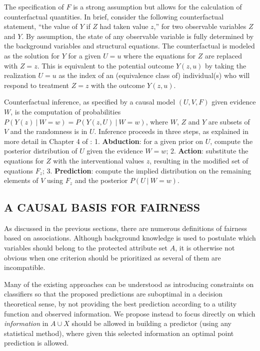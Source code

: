 The specification of $F$ is a strong assumption but allows for the
calculation of counterfactual quantities.  In brief, consider the
following counterfactual statement, ``the value of $Y$ if $Z$ had
taken value $z$,'' for two observable variables $Z$ and $Y$. By
assumption, the state of any observable variable is fully determined
by the background variables and structural equations. The
counterfactual is modeled as the solution for $Y$ for a given $U = u$
where the equations for $Z$ are replaced with $Z \!=\!  z$. This is
equivalent to the potential outcome $Y(z, u)$ \cite{pearl:00}
by taking the realization $U = u$ as the index of an (equivalence
class of) individual(s) who will respond to treatment $Z = z$
with the outcome $Y(z, u)$.

Counterfactual inference, as specified by a causal model $(U, V, F)$
given evidence $W$, is the computation of probabilities $P(Y(z)\ |\ W
\!=\! w) = P(Y(z, U)\ |\ W \!=\! w)$, where $W$, $Z$ and $Y$ are
subsets of $V$ and the randomness is in $U$. Inference proceeds in
three steps, as explained in more detail in Chapter 4 of
\cite{pearl:16}: 1. {\bf Abduction}: for a given prior on $U$, compute
the posterior distribution of $U$ given the evidence $W = w$; 2. {\bf
  Action}: substitute the equations for $Z$ with the interventional
values $z$, resulting in the modified set of equations $F_z$; 3. {\bf
  Prediction}: compute the implied distribution on the remaining
elements of $V$ using $F_z$ and the posterior $P(U\ |\ W = w)$.

\subsection{A CAUSAL BASIS FOR FAIRNESS}

As discussed in the previous sections, there are numerous definitions
of fairness based on associations. Although background knowledge is
used to postulate which variables should belong to the protected
attribute set $A$, it is otherwise not obvious when one criterion
should be prioritized as several of them are incompatible.

Many of the existing approaches can be understood as introducing
constraints on classifiers so that the proposed predictions are
suboptimal in a decision theoretical sense, by not providing the best
prediction according to a utility function and observed information.
We propose instead to focus directly on which \emph{information} in $A
\cup X$ should be allowed in building a predictor (using any
statistical method), where given this selected information an optimal point
prediction is allowed.

